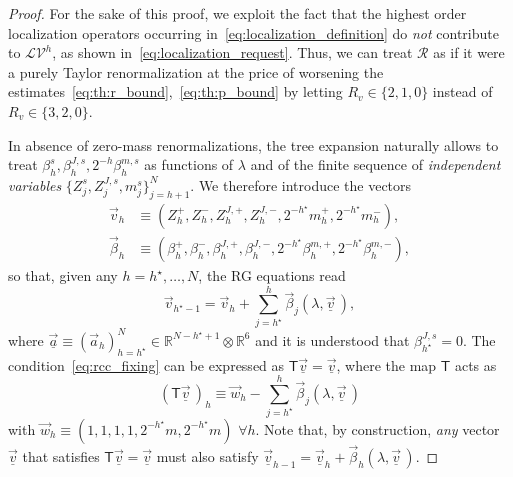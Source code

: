 \documentclass[a4paper, 11pt]{article}
\newcommand{\R}{\mathbb{R}}
\newcommand{\sing}[2]{{#1}^{#2}}							%
\newcommand{\loc}{\mathcal{L}}								%
\newcommand{\ren}{\mathcal{R}}								%
\theoremstyle{thm}
\begin{document}
\begin{proof}
For the sake of this proof, we exploit the fact that the highest order localization operators occurring in~\eqref{eq:localization_definition} do \emph{not} contribute to $\loc \sing{\mathscr{V}}{h}$, as shown in~\eqref{eq:localization_request}. Thus, we can treat $\ren$ as if it were a purely Taylor renormalization at the price of worsening the estimates~\eqref{eq:th:r_bound},~\eqref{eq:th:p_bound} by letting $R_v \in \lbrace 2, 1, 0 \rbrace$ instead of $R_v \in \lbrace 3, 2, 0 \rbrace$.

In absence of zero-mass renormalizations, the tree expansion naturally allows to treat $\beta_h^s, \beta^{J, s}_h, 2^{-h} \beta^{m, s}_h$ as functions of $\lambda$ and of the finite sequence of \emph{independent variables} $\lbrace Z^s_j, Z^{J, s}_j, m^s_j \rbrace_{j =h+1}^N$. We therefore introduce the vectors
\begin{align*}
\vec{v}_h
& \equiv (Z^+_h, Z^-_h, Z^{J, +}_h, Z^{J, -}_h, 2^{-h^\star} m^+_h, 2^{-h^\star} m^-_h), \\
\vec{\beta}_h & \equiv (\beta^+_h, \beta^-_h, \beta^{J, +}_h, \beta^{J, -}_h, 2^{-h^\star} \beta^{m, +}_h, 2^{-h^\star} \beta^{m, -}_h),
\end{align*}
so that, given any $h = h^\star, \dots, N$, the RG equations read
\begin{equation}
\label{eq:rg_equations}
\vec{v}_{h^\star-1} = \vec{v}_h + \sum_{j = h^\star}^h \vec{\beta}_j(\lambda, \underline{\vec{v}} \,),
\end{equation}
where $\underline{\vec{a}} \equiv ( \vec{a}_h )_{h=h^\star}^N \in \R^{N - h^\star + 1} \otimes \R^6$ and it is understood that $\beta^{J, s}_{h^\star} = 0$. The condition~\eqref{eq:rcc_fixing} can be expressed as $\mathsf{T} \underline{\vec{v}} = \underline{\vec{v}}$, where the map $\mathsf{T}$ acts as
\begin{equation}
(\mathsf{T} \underline{\vec{v}} \,)_h \equiv \vec{w}_h - \! \sum_{j = h^\star}^h \vec{\beta}_j(\lambda, \underline{\vec{v}} \,)
\end{equation}
with $\vec{w}_h \equiv (1, 1, 1, 1, 2^{-h^\star} m, 2^{-h^\star} m) \,\, \forall h$. Note that, by construction, \emph{any} vector $\underline{\vec{v}}$ that satisfies $\mathsf{T} \underline{\vec{v}} = \underline{\vec{v}}$ must also satisfy $\underline{\vec{v}}_{h-1} = \underline{\vec{v}}_h + \vec{\beta}_h(\lambda, \underline{\vec{v}} \,)$.


\end{proof}
\end{document}
